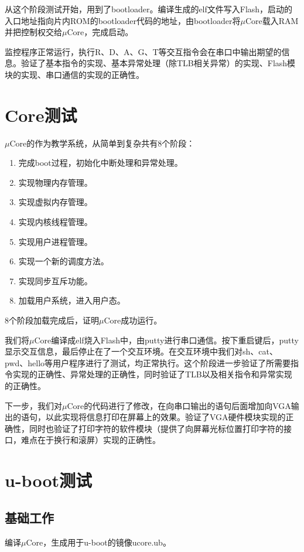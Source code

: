 \documentclass[11pt,utf8]{article}
\begin{document}
{{从这个阶段测试开始，用到了bootloader。编译生成的elf文件写入Flash，启动的入口地址指向片内ROM的bootloader代码的地址，由bootloader将$\mu$Core载入RAM并把控制权交给$\mu$Core，完成启动。

监控程序正常运行，执行R、D、A、G、T等交互指令会在串口中输出期望的信息。验证了基本指令的实现、基本异常处理（除TLB相关异常）的实现、Flash模块的实现、串口通信的实现的正确性。
}

\section{\boldsymbol{\mu}Core测试} {
$\mu$Core的作为教学系统，从简单到复杂共有8个阶段：\begin{enumerate}
	\item 完成boot过程，初始化中断处理和异常处理。
	\item 实现物理内存管理。
	\item 实现虚拟内存管理。
	\item 实现内核线程管理。
	\item 实现用户进程管理。
	\item 实现一个新的调度方法。
	\item 实现同步互斥功能。
	\item 加载用户系统，进入用户态。
\end{enumerate}

8个阶段加载完成后，证明$\mu$Core成功运行。

我们将$\mu$Core编译成elf烧入Flash中，由putty进行串口通信。按下重启键后，putty显示交互信息，最后停止在了一个交互环境。在交互环境中我们对sh、cat、pwd、hello等用户程序进行了测试，均正常执行。这个阶段进一步验证了所需要指令实现的正确性、异常处理的正确性，同时验证了TLB以及相关指令和异常实现的正确性。

下一步，我们对$\mu$Core的代码进行了修改，在向串口输出的语句后面增加向VGA输出的语句，以此实现将信息打印在屏幕上的效果。验证了VGA硬件模块实现的正确性，同时也验证了打印字符的软件模块（提供了向屏幕光标位置打印字符的接口，难点在于换行和滚屏）实现的正确性。
}


\section{u-boot测试} {
\subsection{基础工作} {
编译$\mu$Core，生成用于u-boot的镜像ucore.ub。
}
}}
\end{document}
